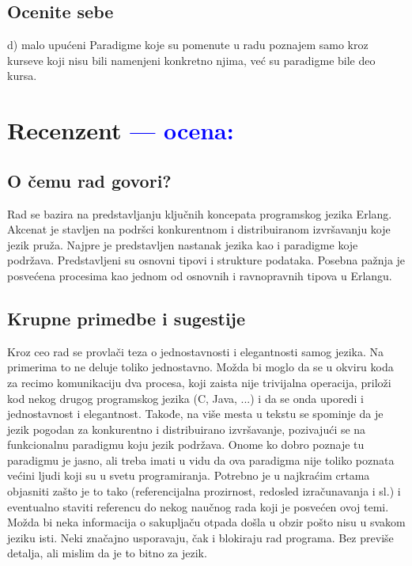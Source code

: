 \documentclass[a4paper]{report}
\newcommand{\odgovor}[1]{\textcolor{blue}{#1}}
\begin{document}
\section{Ocenite sebe}
d) malo upućeni 
Paradigme koje su pomenute u radu poznajem samo kroz kurseve koji nisu bili namenjeni konkretno njima, već su paradigme bile deo kursa.

\chapter{Recenzent \odgovor{--- ocena:} }


\section{O čemu rad govori?}
Rad se bazira na predstavljanju ključnih koncepata programskog jezika Erlang. Akcenat je stavljen na podršci konkurentnom i distribuiranom izvršavanju koje jezik pruža. Najpre je predstavljen nastanak jezika kao i paradigme koje podržava. Predstavljeni su osnovni tipovi i strukture podataka. Posebna pažnja je posvećena procesima kao jednom od osnovnih i ravnopravnih tipova u Erlangu.    

\section{Krupne primedbe i sugestije}
Kroz ceo rad se provlači teza o jednostavnosti i elegantnosti samog jezika. Na primerima to ne deluje toliko jednostavno. Možda bi moglo da se u okviru koda za recimo komunikaciju dva procesa, koji zaista nije trivijalna operacija, priloži kod nekog drugog programskog jezika (C, Java, ...) i da se onda uporedi i jednostavnost i elegantnost.
Takođe, na više mesta u tekstu se spominje da je jezik pogodan za konkurentno i distribuirano izvršavanje, pozivajući se na funkcionalnu paradigmu koju jezik podržava. Onome ko dobro poznaje tu paradigmu je jasno, ali treba imati u vidu da ova paradigma nije toliko poznata većini ljudi koji su u svetu programiranja. Potrebno je u najkraćim crtama objasniti zašto je to tako (referencijalna prozirnost, redosled izračunavanja i sl.) i eventualno staviti referencu do nekog naučnog rada koji je posvećen ovoj temi. Možda bi neka informacija o sakupljaču otpada došla u obzir pošto nisu u svakom jeziku isti. Neki značajno usporavaju, čak i blokiraju rad programa. Bez previše detalja, ali mislim da je to bitno za jezik.
\end{document}
